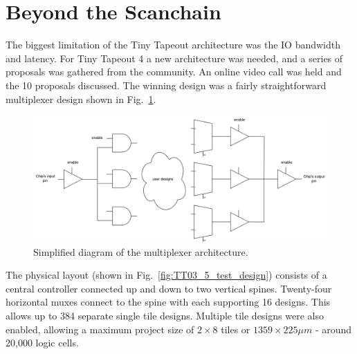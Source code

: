 \section{Beyond the Scanchain}
\label{sec:beyond_scanchain}
The biggest limitation of the Tiny Tapeout architecture was the IO bandwidth and latency.
For Tiny Tapeout 4 a new architecture was needed, and a series of proposals was gathered from the community.
An online video call was held and the 10 proposals discussed.
The winning design was a fairly straightforward multiplexer design shown in Fig.~\ref{fig:multiplexer_design}.

\begin{figure}[htp]
\centering
\includegraphics[width=\columnwidth]{./Figs/mux architecture.png}
\caption{Simplified diagram of the multiplexer architecture.}
\label{fig:multiplexer_design}
\end{figure}

The physical layout (shown in Fig.~\ref{fig:TT03_5_test_design}) consists of a central controller connected up and down to two vertical spines.
Twenty-four horizontal muxes connect to the spine with each supporting 16 designs.
This allows up to 384 separate single tile designs.
Multiple tile designs were also enabled, allowing a maximum project size of \(2 \times 8\) tiles or \(1359 \times 225 \mu m\) - around 20,000 logic cells.

